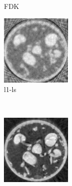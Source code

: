 \documentclass[journal]{IEEEtran}
\begin{document}
\begin{figure}[!h]
\begin{subfigure}[b]{0.3\linewidth}
        \caption{FDK}
    \end{subfigure}
\quad
    \begin{subfigure}[b]{0.3\linewidth}
        \includegraphics[width=\textwidth]{../images/sprouts/csIm.png}
        \caption{l1-ls}
     \end{subfigure}\\
\quad
    \begin{subfigure}[b]{0.3\linewidth}
        \includegraphics[width=\textwidth]{../images/sprouts/plainPriorIm.png}

\end{subfigure}
\end{figure}
\end{document}
